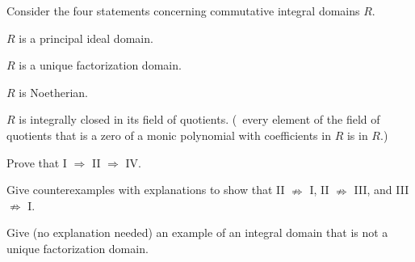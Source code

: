 Consider the four statements concerning commutative integral domains
$R$.  
\begin{Rlist}
\item $R$ is a principal ideal domain.
\item $R$ is a unique factorization domain.
\item $R$ is Noetherian.
\item $R$ is integrally closed in its field of quotients. (\Ie\ every
element of the field of quotients that is a zero of a monic polynomial
with coefficients in $R$ is in $R$.)
\end{Rlist}
\begin{alist}
\item Prove that I $\Rightarrow $ II $\Rightarrow $ IV.
\item Give counterexamples with explanations to show that
II $\nRightarrow $ I, II $\nRightarrow $ III, and
III $\nRightarrow $ I. 
\item Give (no explanation needed) an example of an integral domain
that is not a unique factorization domain.
\end{alist}

